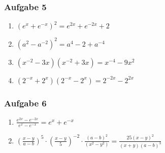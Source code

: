 \subsubsection{Aufgabe 5} 
\begin{enumerate}
	\item \quad $ (e^x+e^{-x})^2 =e^{2x}+e^{-2x}+2 $	%
	\item \quad $ (a^2-a^{-2})^2 =a^4 - 2 +a^{-4} $		%
	\item \quad $ (x^{-2}-3x)(x^{-2}+3x) =x^{-4}-9x^2 $				%
	\item \quad $ (2^{-x}+2^x)(2^{-x}-2^x) =2^{-2x}-2^{2x} $		%
\end{enumerate}

\subsubsection{Aufgabe 6} 
\begin{enumerate}
	\item \quad $\frac{e^{2x}-e^{-2x}}{e^x-e^{-x}} = e^x + e^{-x} $	%
	\item \quad $\left(\frac{x-y}{a-b}\right)^5 \cdot \left(\frac{x-y}{5}\right)^{-2} \cdot \frac{(a-b)^2}{(x^2-y^2)}=\frac{25(x-y)^2}{(x+y)(a-b)^3} $									%
\end{enumerate}